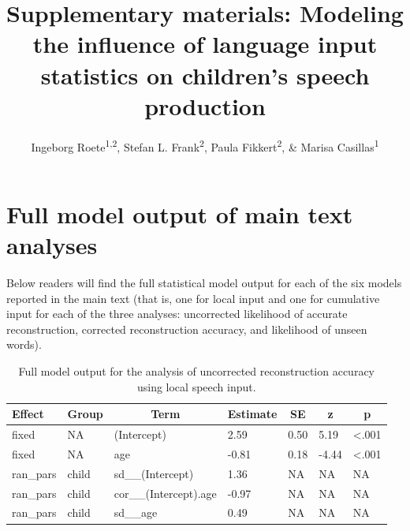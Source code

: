 \documentclass[
  english,
  man,floatsintext]{apa6}
\title{Supplementary materials: Modeling the influence of language input statistics on children's speech production}
\author{Ingeborg Roete\textsuperscript{1,2}, Stefan L. Frank\textsuperscript{2}, Paula Fikkert\textsuperscript{2}, \& Marisa Casillas\textsuperscript{1}}
\date{}
\affiliation{\vspace{0.5cm}\textsuperscript{1} Max Planck Institute for Psycholinguistics\\\textsuperscript{2} Radboud University}
\begin{document}
\maketitle

\hypertarget{full-model-output-of-main-text-analyses}{%
\section{Full model output of main text analyses}\label{full-model-output-of-main-text-analyses}}

Below readers will find the full statistical model output for each of the six models reported in the main text (that is, one for local input and one for cumulative input for each of the three analyses: uncorrected likelihood of accurate reconstruction, corrected reconstruction accuracy, and likelihood of unseen words).

\pagebreak

\begin{table}[tbp]

\begin{center}
\begin{threeparttable}

\caption{\label{tab:tab-uncorr_reconstr_acc-local-MAIN}Full model output for the analysis of uncorrected reconstruction accuracy using local speech input.}

\begin{tabular}{lllllll}
\toprule
Effect & \multicolumn{1}{c}{Group} & \multicolumn{1}{c}{Term} & \multicolumn{1}{c}{Estimate} & \multicolumn{1}{c}{SE} & \multicolumn{1}{c}{z} & \multicolumn{1}{c}{p}\\
\midrule
fixed & NA & (Intercept) & 2.59 & 0.50 & 5.19 & <.001\\
fixed & NA & age & -0.81 & 0.18 & -4.44 & <.001\\
ran\_pars & child & sd\_\_(Intercept) & 1.36 & NA & NA & NA\\
ran\_pars & child & cor\_\_(Intercept).age & -0.97 & NA & NA & NA\\
ran\_pars & child & sd\_\_age & 0.49 & NA & NA & NA\\
\bottomrule
\end{tabular}

\end{threeparttable}
\end{center}

\end{table}
\end{document}

